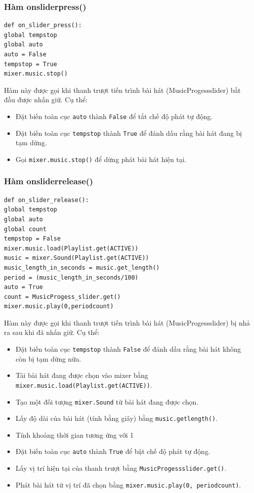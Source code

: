 \documentclass[a4paper]{article}
\begin{document}
\begin{enumerate}
\subsubsection{Hàm onsliderpress()}
\begin{mdframed}[hidealllines=true,backgroundcolor=magenta!10]
\begin{lstlisting}
def on_slider_press():
global tempstop
global auto
auto = False
tempstop = True
mixer.music.stop()
\end{lstlisting}
\end{mdframed}
Hàm này được gọi khi thanh trượt tiến trình bài hát (MusicProgessslider) bắt đầu được nhấn giữ. Cụ thể:
\begin{itemize}
\item Đặt biến toàn cục \texttt{auto} thành \texttt{False} để tắt chế độ phát tự động.
\item Đặt biến toàn cục \texttt{tempstop} thành \texttt{True} để đánh dấu rằng bài hát đang bị tạm dừng.
\item Gọi \texttt{mixer.music.stop()} để dừng phát bài hát hiện tại.
\end{itemize}
\subsubsection{Hàm onsliderrelease()}
\begin{mdframed}[hidealllines=true,backgroundcolor=magenta!10]
\begin{lstlisting}
def on_slider_release():
global tempstop
global auto
global count
tempstop = False
mixer.music.load(Playlist.get(ACTIVE))
music = mixer.Sound(Playlist.get(ACTIVE))
music_length_in_seconds = music.get_length()
period = (music_length_in_seconds/100)
auto = True
count = MusicProgess_slider.get()
mixer.music.play(0,periodcount)
\end{lstlisting}
\end{mdframed}
Hàm này được gọi khi thanh trượt tiến trình bài hát (MusicProgessslider) bị nhả ra sau khi đã nhấn giữ. Cụ thể:
\begin{itemize}
\item Đặt biến toàn cục \texttt{tempstop} thành \texttt{False} để đánh dấu rằng bài hát không còn bị tạm dừng nữa.
\item Tải bài hát đang được chọn vào mixer bằng \texttt{mixer.music.load(Playlist.get(ACTIVE))}.
\item Tạo một đối tượng \texttt{mixer.Sound} từ bài hát đang được chọn.
\item Lấy độ dài của bài hát (tính bằng giây) bằng \texttt{music.getlength()}.
\item Tính khoảng thời gian tương ứng với 1%
\item Đặt biến toàn cục \texttt{auto} thành \texttt{True} để bật chế độ phát tự động.
\item Lấy vị trí hiện tại của thanh trượt bằng \texttt{MusicProgessslider.get()}.
\item Phát bài hát từ vị trí đã chọn bằng \texttt{mixer.music.play(0, periodcount)}.
\end{itemize}

\end{enumerate}
\end{document}
